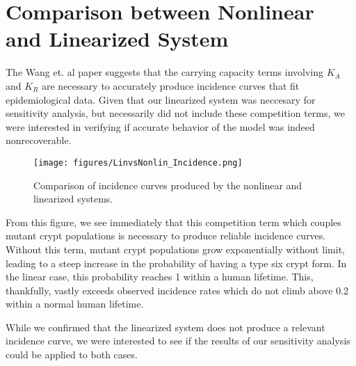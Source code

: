 \section{Comparison between Nonlinear and Linearized System}

The Wang et. al paper suggests that the carrying capacity terms involving $K_A$ and $K_R$ are necessary to accurately produce incidence curves that fit epidemiological data. Given that our linearized system was neccesary for sensitivity analysis, but necessarily did not include these competition terms, we were interested in verifying if accurate behavior of the model was indeed nonrecoverable. 

\begin{figure}[h]
    \centering
    \texttt{[image: figures/LinvsNonlin\_Incidence.png]}
    \caption{Comparison of incidence curves produced by the nonlinear and linearized systems.}
    \label{fig:linear sys empirical}
\end{figure}

\FloatBarrier 
From this figure, we see immediately that this competition term which couples mutant crypt populations is necessary to produce reliable incidence curves. Without this term, mutant crypt populations grow exponentially without limit, leading to a steep increase in the probability of having a type six crypt form. In the linear case, this probability reaches 1 within a human lifetime. This, thankfully, vastly exceeds observed incidence rates which do not climb above 0.2 within a normal human lifetime.

While we confirmed that the linearized system does not produce a relevant incidence curve, we were interested to see if the results of our sensitivity analysis could be applied to both cases.